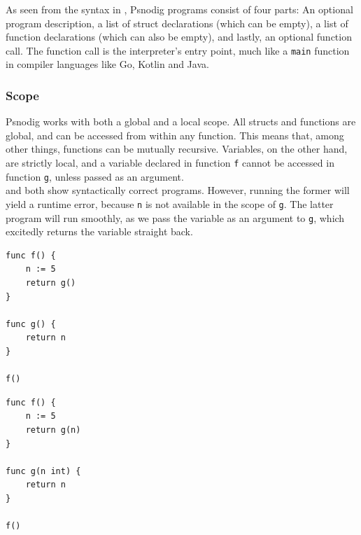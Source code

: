 As seen from the syntax in , Psnodig programs consist of four parts: An optional program description, a list of struct declarations (which can be empty), a list of function declarations (which can also be empty), and lastly, an optional function call. The function call is the interpreter's entry point, much like a \texttt{main} function in compiler languages like Go, Kotlin and Java.

\subsubsection{Scope}

Psnodig works with both a global and a local scope. All structs and functions are global, and can be accessed from within any function. This means that, among other things, functions can be mutually recursive. Variables, on the other hand, are strictly local, and a variable declared in function \texttt{f} cannot be accessed in function \texttt{g}, unless passed as an argument. \\

 and  both show syntactically correct programs. However, running the former will yield a runtime error, because \texttt{n} is not available in the scope of \texttt{g}. The latter program will run smoothly, as we pass the variable as an argument to \texttt{g}, which excitedly returns the variable straight back. \\

\begin{minipage}{.45\textwidth}
\begin{lstlisting}[caption={Gourmet program which provokes a runtime error.}, captionpos=b, label={Gourmet program which provokes a runtime error.}]
func f() {
    n := 5
    return g()
}

func g() {
    return n
}

f()
\end{lstlisting}
\end{minipage}\hfill
\begin{minipage}{.45\textwidth}
\begin{lstlisting}[caption={Gourmet program that will run uninterrupted.}, captionpos=b, label={Gourmet code without error.}]
func f() {
    n := 5
    return g(n)
}

func g(n int) {
    return n
}

f()
\end{lstlisting}
\end{minipage}

